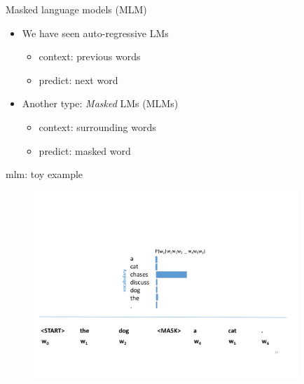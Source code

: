 
\begin{vbframe}{Masked language models (MLM)}

\vfill

\begin{itemize}
	\item We have seen auto-regressive LMs
			\begin{itemize}
				\item context: previous words
				\item predict: next word
			\end{itemize}
	\item Another type: \textit{Masked} LMs (MLMs)
			\begin{itemize}
				\item context: surrounding words
				\item predict: masked word
			\end{itemize}
\end{itemize}

\vfill

\end{vbframe}


\begin{vbframe}{mlm: toy example}

\vfill

	\begin{figure}
		\centering
		\includegraphics[width=10cm]{figure/mlm.pdf}
	\end{figure}
	
\vfill

\end{vbframe}

